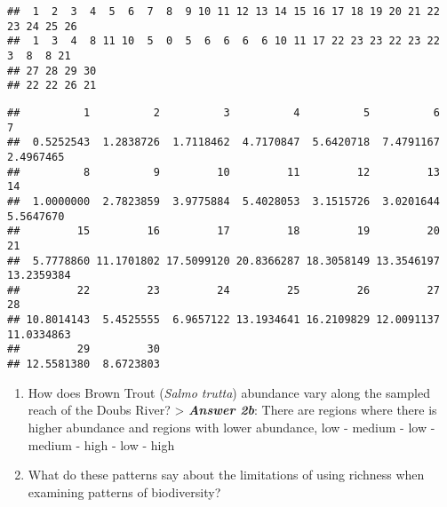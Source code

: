 \documentclass[
]{article}
\newenvironment{Shaded}{\begin{snugshade}}{\end{snugshade}}
\newcommand{\AttributeTok}[1]{\textcolor[rgb]{0.77,0.63,0.00}{#1}}
\newcommand{\ControlFlowTok}[1]{\textcolor[rgb]{0.13,0.29,0.53}{\textbf{#1}}}
\newcommand{\DecValTok}[1]{\textcolor[rgb]{0.00,0.00,0.81}{#1}}
\newcommand{\FunctionTok}[1]{\textcolor[rgb]{0.00,0.00,0.00}{#1}}
\newcommand{\NormalTok}[1]{#1}
\newcommand{\OtherTok}[1]{\textcolor[rgb]{0.56,0.35,0.01}{#1}}
\newcommand{\SpecialCharTok}[1]{\textcolor[rgb]{0.00,0.00,0.00}{#1}}
\newcommand{\StringTok}[1]{\textcolor[rgb]{0.31,0.60,0.02}{#1}}
\begin{document}
\begin{Shaded}
\end{Shaded}

\begin{verbatim}
##  1  2  3  4  5  6  7  8  9 10 11 12 13 14 15 16 17 18 19 20 21 22 23 24 25 26 
##  1  3  4  8 11 10  5  0  5  6  6  6  6 10 11 17 22 23 23 22 23 22  3  8  8 21 
## 27 28 29 30 
## 22 22 26 21
\end{verbatim}

\begin{Shaded}
\end{Shaded}

\begin{verbatim}
##          1          2          3          4          5          6          7 
##  0.5252543  1.2838726  1.7118462  4.7170847  5.6420718  7.4791167  2.4967465 
##          8          9         10         11         12         13         14 
##  1.0000000  2.7823859  3.9775884  5.4028053  3.1515726  3.0201644  5.5647670 
##         15         16         17         18         19         20         21 
##  5.7778860 11.1701802 17.5099120 20.8366287 18.3058149 13.3546197 13.2359384 
##         22         23         24         25         26         27         28 
## 10.8014143  5.4525555  6.9657122 13.1934641 16.2109829 12.0091137 11.0334863 
##         29         30 
## 12.5581380  8.6723803
\end{verbatim}

\begin{enumerate}
\def\labelenumi{\alph{enumi}.}
\setcounter{enumi}{1}
\item
  How does Brown Trout (\emph{Salmo trutta}) abundance vary along the
  sampled reach of the Doubs River? \textgreater{} \textbf{\emph{Answer
  2b}}: There are regions where there is higher abundance and regions
  with lower abundance, low - medium - low - medium - high - low - high
\item
  What do these patterns say about the limitations of using richness
  when examining patterns of biodiversity?
\end{enumerate}
\end{document}
